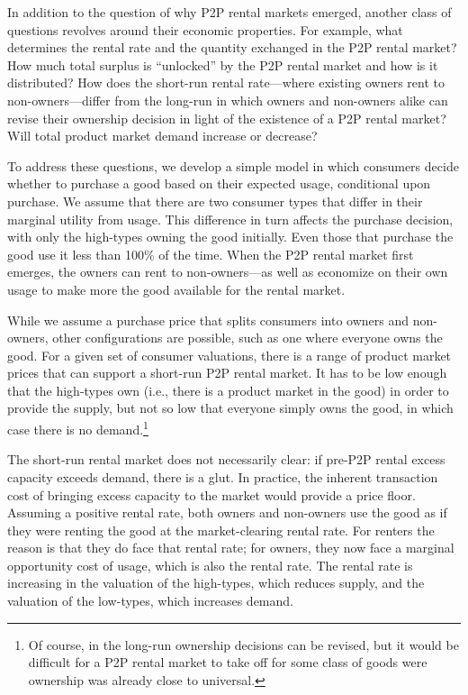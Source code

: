 \documentclass[11pt]{article}
\begin{document}
In addition to the question of why P2P rental markets emerged, another class of questions revolves around their economic properties. 
For example, what determines the rental rate and the quantity exchanged in the P2P rental market? 
How much total surplus is ``unlocked'' by the P2P rental market and how is it distributed? 
How does the short-run rental rate---where existing owners rent to non-owners---differ from the long-run in which owners and non-owners alike can revise their ownership decision in light of the existence of a P2P rental market?  
Will total product market demand increase or decrease?

To address these questions, we develop a simple model in which consumers decide whether to purchase a good based on their expected usage, conditional upon purchase. 
We assume that there are two consumer types that differ in their marginal utility from usage. 
This difference in turn affects the purchase decision, with only the high-types owning the good initially.  
Even those that purchase the good use it less than 100\% of the time. 
When the P2P rental market first emerges, the owners can rent to non-owners---as well as economize on their own usage to make more the good available for the rental market.

While we assume a purchase price that splits consumers into owners and non-owners, other configurations are possible, such as one where everyone owns the good.
For a given set of consumer valuations, there is a range of product market prices that can support a short-run P2P rental market.
It has to be low enough that the high-types own (i.e., there is a product market in the good) in order to provide the supply, but not so low that everyone simply owns the good, in which case there is no demand.\footnote{
  Of course, in the long-run ownership decisions can be revised, but it would be difficult for a P2P rental market to take off for some class of goods were ownership was already close to universal.
}   

The short-run rental market does not necessarily clear: if pre-P2P rental excess capacity exceeds demand, there is a glut. 
In practice, the inherent transaction cost of bringing excess capacity to the market would provide a price floor.     
Assuming a positive rental rate, both owners and non-owners use the good as if they were renting the good at the market-clearing rental rate. 
For renters the reason is that they do face that rental rate; 
for owners, they now face a marginal opportunity cost of usage, which is also the rental rate. 
The rental rate is increasing in the valuation of the high-types, which reduces supply, and the valuation of the low-types, which increases demand. 
\end{document}
